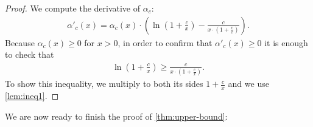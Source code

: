\documentclass[envcountsect,envcountsame]{llncs}
\begin{document}
	\begin{proof}
		We compute the derivative of $\alpha_c$:
		\begin{align*}
			\alpha'_c(x) = \alpha_c(x)\cdot \left( \ln \left( 1 + \frac{c}{x} \right) - \frac{c}{x\cdot \left(1 + \frac{c}{x} \right)} \right).
		\end{align*}
		Because $\alpha_c(x) \geq 0$ for $x > 0$, in order to confirm that $\alpha'_c(x) \geq 0$ it is enough to check that
		\begin{align*}
			\ln \left( 1 + \frac{c}{x} \right) \geq \frac{c}{x\cdot \left(1 + \frac{c}{x} \right)}.
		\end{align*}
		To show this inequality, we multiply to both its sides $1 + \frac{c}{x}$ and we use \cref{lem:ineq1}.
	\end{proof}

	We are now ready to finish the proof of \cref{thm:upper-bound}:
\end{document}
